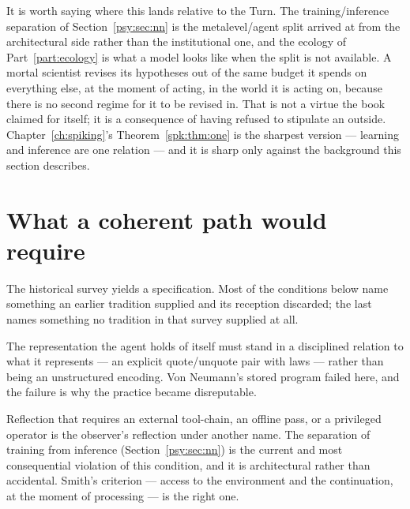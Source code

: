 \begin{remark}
\label{psy:rem:same-split}
It is worth saying where this lands relative to the Turn.
The training/inference separation of
Section~\ref{psy:sec:nn} is the metalevel/agent split arrived at
from the architectural side rather than the institutional one, and
the ecology of Part~\ref{part:ecology} is what a model looks like
when the split is not available.
A mortal scientist revises its hypotheses out of the same budget it
spends on everything else, at the moment of acting, in the world it
is acting on, because there is no second regime for it to be
revised in.
That is not a virtue the book claimed for itself; it is a
consequence of having refused to stipulate an outside.
Chapter~\ref{ch:spiking}'s Theorem~\ref{spk:thm:one} is the sharpest
version --- learning and inference are one relation --- and it is
sharp only against the background this section describes.
\end{remark}

\section{What a coherent path would require}
\label{psy:sec:conditions}

The historical survey yields a specification.
Most of the conditions below name something an earlier tradition
supplied and its reception discarded; the last names something no
tradition in that survey supplied at all.

\begin{requirement}
\label{psy:req:structural}
The representation the agent holds of itself must stand in a
disciplined relation to what it represents --- an explicit
quote/unquote pair with laws --- rather than being an unstructured
encoding.
Von Neumann's stored program failed here, and the failure is why the
practice became disreputable.
\end{requirement}

\begin{requirement}
\label{psy:req:runtime}
Reflection that requires an external tool-chain, an offline pass, or
a privileged operator is the observer's reflection under another
name.
The separation of training from inference
(Section~\ref{psy:sec:nn}) is the current and most consequential
violation of this condition, and it is architectural rather than
accidental.
Smith's criterion --- access to the environment and the
continuation, at the moment of processing --- is the right one.
\end{requirement}

